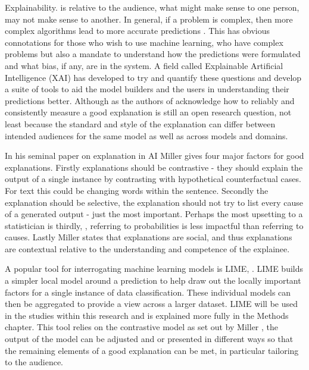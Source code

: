 Explainability. is relative to the audience, what might make sense to one person, may not make sense to another. In general, if a problem is complex, then more complex algorithms lead to more accurate predictions \parencite{arrieta2020explainable}. This has obvious connotations for those who wish to use machine learning, who have complex problems but also a mandate to understand how the predictions were formulated and what bias, if any, are in the system. A field called Explainable Artificial Intelligence (XAI)  \parencite{gunning2019xai} has developed to try and quantify these questions and develop a suite of tools to aid the model builders and the users in understanding their predictions better.  Although as the authors of \parencite{gunning2019xai}  acknowledge how to reliably and consistently measure a good explanation is still an open research question, not least because the standard and style of the explanation can differ between intended audiences for the same model as well as across models and domains.

In his seminal paper on explanation in AI \parencite{miller2019explanation} Miller gives four major factors for good explanations. Firstly explanations should be contrastive - they should explain the output of a single instance by contrasting with hypothetical counterfactual cases. For text this could be changing words within the sentence.  Secondly the explanation should be selective, the explanation should not try to list every cause of a generated output - just the most important. Perhaps the most upsetting to a statistician is thirdly,  ,  referring to probabilities is less impactful than referring to causes. Lastly Miller states that explanations are social, and thus explanations are contextual relative to the understanding and competence of the explainee. 

A popular tool  for interrogating machine learning models is LIME, \parencite{ribeiro2016should}. LIME  builds a simpler local model around a prediction to help draw out the locally important factors for a single instance of data classification. These individual models can then be aggregated to provide a view across a larger dataset.  LIME will be used in the studies within this research and is explained more fully in the Methods chapter. This tool relies on the contrastive model as set out by Miller \parencite{miller2019explanation}, the output of the model can be adjusted and or presented in different ways so that the remaining elements of a good explanation can be met, in particular tailoring to the audience.

